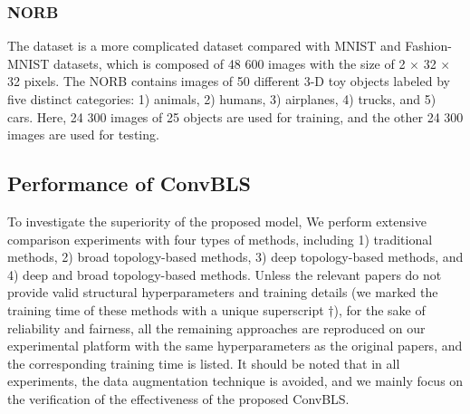 \documentclass[lettersize,journal]{IEEEtran}
\begin{document}
\subsubsection{NORB}
The dataset\cite{lecun2004learning} is a more complicated dataset compared with MNIST and Fashion-MNIST datasets, which is composed of 48 600 images with the size of 2 $\times$ 32 $\times$ 32 pixels. The NORB contains images of 50 different 3-D toy objects labeled by five distinct categories: 1) animals, 2) humans, 3) airplanes, 4) trucks, and 5) cars. Here, 24 300 images of 25 objects are used for training, and the other 24 300 images are used for testing.

\subsection{Performance of ConvBLS}
To investigate the superiority of the proposed model, We perform extensive comparison experiments with four types of methods, including 1) traditional methods, 2) broad topology-based methods, 3) deep topology-based methods, and 4) deep and broad topology-based methods. Unless the relevant papers do not provide valid structural hyperparameters and training details (we marked the training time of these methods with a unique superscript $\dag$), for the sake of reliability and fairness, all the remaining approaches are reproduced on our experimental platform with the same hyperparameters as the original papers, and the corresponding training time is listed. It should be noted that in all experiments, the data augmentation technique is avoided, and we mainly focus on the verification of the effectiveness of the proposed ConvBLS.
\end{document}
